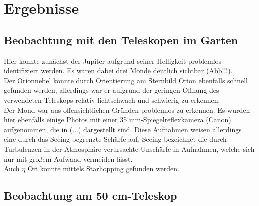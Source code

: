 \section{Ergebnisse}
\subsection{Beobachtung mit den Teleskopen im Garten}
Hier konnte zunächst der Jupiter aufgrund seiner Helligkeit problemlos identifiziert werden. Es waren dabei drei Monde deutlich sichtbar (Abb!!!). \\
Der Orionnebel konnte durch Orientierung am Sternbild Orion ebenfalls schnell gefunden werden, allerdings war er aufgrund der geringen Öffnung des verwendeten Teleskops relativ lichtschwach und schwierig zu erkennen. \\
Der Mond war aus offensichtlichen Gründen problemlos zu erkennen. Es wurden hier ebenfalls einige Photos mit einer 35 mm-Spiegelreflexkamera (Canon) aufgenommen, die in (...) dargestellt sind. Diese Aufnahmen weisen allerdings eine durch das Seeing begrenzte Schärfe auf. Seeing bezeichnet die durch Turbulenzen in der Atmosphäre verursachte Unschärfe in Aufnahmen, welche sich nur mit großem Aufwand vermeiden lässt. \\
Auch $\eta$ Ori konnte mittels Starhopping gefunden werden.

\subsection{Beobachtung am 50 cm-Teleskop} 

